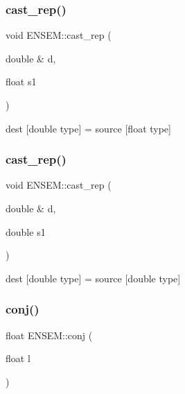 \subsubsection{\texorpdfstring{cast\_rep()}{cast\_rep()}\hspace{0.1cm}{\footnotesize\ttfamily [5/6]}}
{\footnotesize\ttfamily void E\+N\+S\+E\+M\+::cast\+\_\+rep (\begin{DoxyParamCaption}\item[{double \&}]{d,  }\item[{float}]{s1 }\end{DoxyParamCaption})\hspace{0.3cm}{\ttfamily [inline]}}



dest \mbox{[}double type\mbox{]} = source \mbox{[}float type\mbox{]} 

\mbox{\label{group__simpleword_ga8cac7966a593620ed6aa821a74ebe0fd}} 
\subsubsection{\texorpdfstring{cast\_rep()}{cast\_rep()}\hspace{0.1cm}{\footnotesize\ttfamily [6/6]}}
{\footnotesize\ttfamily void E\+N\+S\+E\+M\+::cast\+\_\+rep (\begin{DoxyParamCaption}\item[{double \&}]{d,  }\item[{double}]{s1 }\end{DoxyParamCaption})\hspace{0.3cm}{\ttfamily [inline]}}



dest \mbox{[}double type\mbox{]} = source \mbox{[}double type\mbox{]} 

\mbox{\label{group__simpleword_ga1952c9e46ce2b45d95d5bb33e32688c4}} 
\subsubsection{\texorpdfstring{conj()}{conj()}\hspace{0.1cm}{\footnotesize\ttfamily [1/3]}}
{\footnotesize\ttfamily float E\+N\+S\+E\+M\+::conj (\begin{DoxyParamCaption}\item[{float}]{l }\end{DoxyParamCaption})\hspace{0.3cm}{\ttfamily [inline]}}

